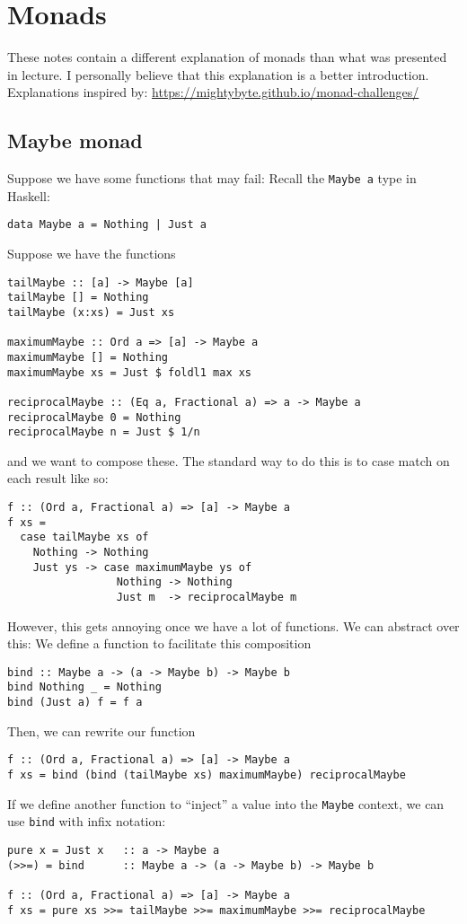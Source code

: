 \documentclass[class=scrartcl]{standalone}
\begin{document}
\section{Monads}
These notes contain a different explanation of monads
than what was presented in lecture.
I personally believe that this explanation is a better introduction.
Explanations inspired by:
\url{https://mightybyte.github.io/monad-challenges/}


\subsection{Maybe monad}
Suppose we have some functions that may fail:
Recall the \texttt{Maybe a} type in Haskell:
\begin{verbatim}
data Maybe a = Nothing | Just a
\end{verbatim}
Suppose we have the functions
\begin{verbatim}
tailMaybe :: [a] -> Maybe [a]
tailMaybe [] = Nothing
tailMaybe (x:xs) = Just xs

maximumMaybe :: Ord a => [a] -> Maybe a
maximumMaybe [] = Nothing
maximumMaybe xs = Just $ foldl1 max xs

reciprocalMaybe :: (Eq a, Fractional a) => a -> Maybe a
reciprocalMaybe 0 = Nothing
reciprocalMaybe n = Just $ 1/n
\end{verbatim}
and we want to compose these.
The standard way to do this is
to case match on each result like so:
\begin{verbatim}
f :: (Ord a, Fractional a) => [a] -> Maybe a
f xs =
  case tailMaybe xs of
    Nothing -> Nothing
    Just ys -> case maximumMaybe ys of
                 Nothing -> Nothing
                 Just m  -> reciprocalMaybe m
\end{verbatim}
However, this gets annoying once we have a lot of functions.
We can abstract over this:
We define a function to facilitate this composition
\begin{verbatim}
bind :: Maybe a -> (a -> Maybe b) -> Maybe b
bind Nothing _ = Nothing
bind (Just a) f = f a
\end{verbatim}
Then, we can rewrite our function
\begin{verbatim}
f :: (Ord a, Fractional a) => [a] -> Maybe a
f xs = bind (bind (tailMaybe xs) maximumMaybe) reciprocalMaybe
\end{verbatim}
If we define another function to ``inject''
a value into the \texttt{Maybe} context,
we can use \texttt{bind} with infix notation:
\begin{verbatim}
pure x = Just x   :: a -> Maybe a
(>>=) = bind      :: Maybe a -> (a -> Maybe b) -> Maybe b

f :: (Ord a, Fractional a) => [a] -> Maybe a
f xs = pure xs >>= tailMaybe >>= maximumMaybe >>= reciprocalMaybe
\end{verbatim}
\end{document}
